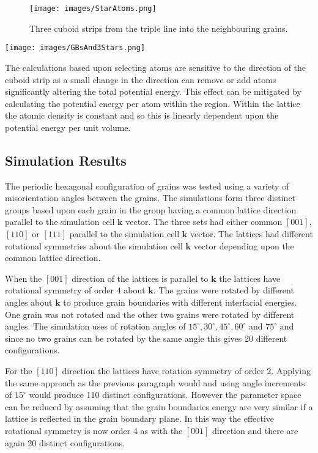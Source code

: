 \documentclass[12pt,a4paper]{book}
\begin{document}
\begin{figure}
	\texttt{[image: images/StarAtoms.png]} 
	\label{fig:StarAtoms}
	\caption{Three cuboid strips from the triple line into the
	neighbouring grains.}
\end{figure}

\texttt{[image: images/GBsAnd3Stars.png]} 

The calculations based upon selecting atoms are sensitive to the direction of the cuboid strip as a small change in the direction can remove or add atoms significantly altering the total potential energy. This effect can be mitigated by calculating the potential energy per atom within the region. Within the lattice the atomic density is constant and so this is linearly dependent upon the potential energy per unit volume. 

\subsection{Simulation Results} \label{sec:SimulationResults}

The periodic hexagonal configuration of grains was tested using a variety of misorientation angles between the grains.  The simulations form three distinct groups based upon each grain in the group having a common lattice direction parallel to the simulation cell $\mathbf{k}$ vector. The three sets had either common $[0 0 1]$, $[1 1 0]$ or $[1 1 1]$ parallel to the simulation cell $\mathbf{k}$ vector. The lattices had different rotational symmetries about the simulation cell $\mathbf{k}$ vector depending upon the common lattice direction.

When the $[0 0 1]$ direction of the lattices is parallel to $\mathbf{k}$ the lattices have rotational symmetry of order 4 about $\mathbf{k}$.  The grains were rotated by different angles about $\mathbf{k}$ to produce grain boundaries with different interfacial energies. One grain was not rotated and the other two grains were rotated by different angles. The simulation uses of rotation angles of $15^{\circ},30^{\circ},45^{\circ},60^{\circ}$ and $75^{\circ}$ and since no two grains can be rotated by the same angle this gives 20 different configurations.

For the $[1 1 0]$ direction the lattices have rotation symmetry of order 2. Applying the same approach as the previous paragraph would and using angle increments of $15^{\circ}$ would produce 110 distinct configurations. However the parameter space can be reduced by assuming that the grain boundaries energy are very similar if a lattice is reflected in the grain boundary plane. In this way the effective rotational symmetry is now order 4 as with the $[0 0 1]$ direction and there are again 20 distinct configurations.  
\end{document}
